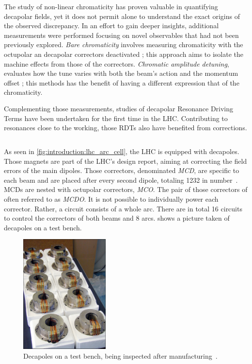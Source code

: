 The study of non-linear chromaticity has proven valuable in quantifying decapolar fields, yet it
does not permit alone to understand the exact origins of the observed discrepancy. In an effort to
gain deeper insights, additional measurements were performed focusing on novel observables that had
not been previously explored.
\textit{Bare chromaticity} involves measuring chromaticity with
the octupolar an decapolar correctors deactivated ; this approach aims to isolate the machine
effects from those of the correctors.
\textit{Chromatic amplitude detuning}, evaluates how the tune varies with both the beam's action and
the momentum offset ; this methods has the benefit of having a different expression that of the
chromaticity.

Complementing those measurements, studies of decapolar Resonance Driving Terms have been undertaken
for the first time in the LHC. Contributing to resonances close to the working, those RDTs also have
benefited from corrections.


\subsection{}

As seen in \cref{fig:introduction:lhc_arc_cell}, the LHC is equipped with decapoles. Those magnets
are part of the LHC's design report, aiming at correcting the field errors of the main dipoles.
Those correctors, denominated \textit{MCD}, are specific to each beam and are placed after every
second dipole, totaling 1232 in number~\cite{venturini_delsolaro_magnetic_2005}.
MCDs are nested with octupolar correctors, \textit{MCO}. The pair of those correctors of often
referred to as \textit{MCDO}. 
It is not possible to individually power each corrector. Rather, a circuit consists of a whole arc.
There are in total 16 circuits to control the correctors of both beams and 8 arcs.
 shows a picture taken of decapoles on a test bench.

\begin{figure}
    \centering
    \includegraphics[width=0.4\textwidth]{./images/decapoles_real_pic.jpg}
    \caption{Decapoles on a test bench, being inspected after
    manufacturing~\cite{noauthor_ten_2001}.}
    \label{fig:decapoles:decapole_picture}
\end{figure}


